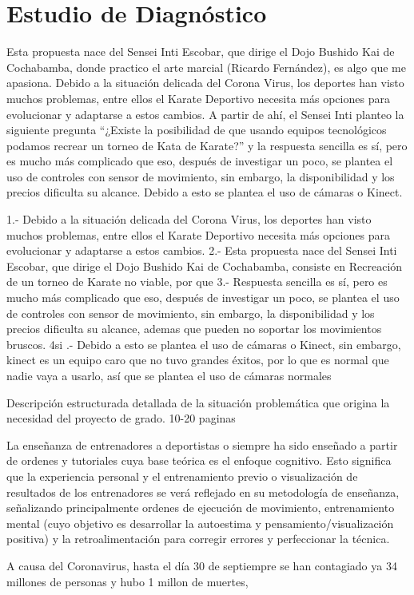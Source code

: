 \chapter{Estudio de Diagnóstico}


Esta propuesta nace del Sensei Inti Escobar, que dirige el Dojo Bushido Kai de Cochabamba, donde practico el arte marcial (Ricardo Fernández), es algo que me apasiona. Debido a la situación delicada del Corona Virus, los deportes han visto muchos problemas, entre ellos el Karate Deportivo necesita más opciones para evolucionar y adaptarse a estos cambios.
A partir de ahí, el Sensei Inti planteo la siguiente pregunta “¿Existe la posibilidad de que usando equipos tecnológicos podamos recrear un torneo de Kata de Karate?” y la respuesta sencilla es sí, pero es mucho más complicado que eso, después de investigar un poco, se plantea el uso de controles con sensor de movimiento, sin embargo, la disponibilidad y los precios dificulta su alcance. Debido a esto se plantea el uso de cámaras o Kinect.


1.- Debido a la situación delicada del Corona Virus, los deportes han visto muchos problemas, entre ellos el Karate Deportivo necesita más opciones para evolucionar y adaptarse a estos cambios.
2.- Esta propuesta nace del Sensei Inti Escobar, que dirige el Dojo Bushido Kai de Cochabamba, consiste en  Recreación de un torneo de Karate no viable, por que
3.- Respuesta sencilla es sí, pero es mucho más complicado que eso, después de investigar un poco, se plantea el uso de controles con sensor de movimiento, sin embargo, la disponibilidad y los precios dificulta su alcance, ademas que pueden no soportar los movimientos bruscos.
4si .- Debido a esto se plantea el uso de cámaras o Kinect, sin embargo, kinect es un equipo caro que no tuvo grandes éxitos, por lo que es normal que nadie vaya a usarlo, así que se plantea el uso de cámaras normales


Descripción estructurada detallada de la situación
problemática que origina la necesidad del proyecto
de grado.
10-20 paginas

La enseñanza de entrenadores a deportistas o siempre ha sido enseñado a partir de ordenes y tutoriales cuya base teórica es el enfoque cognitivo. Esto significa que la experiencia personal y el entrenamiento previo o visualización de resultados de los entrenadores se verá reflejado en su metodología de enseñanza, señalizando principalmente ordenes de ejecución de movimiento, entrenamiento mental (cuyo objetivo es desarrollar la autoestima y pensamiento/visualización positiva) y la retroalimentación para corregir errores y perfeccionar la técnica.




A causa del Coronavirus, hasta el día 30 de septiempre se han contagiado ya 34 millones de personas y hubo 1 millon de muertes, 



